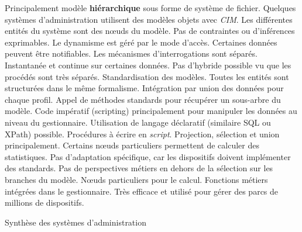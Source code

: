 \begin{table}[!ht]
\criteretabDonnee
    {Principalement modèle \textbf{hiérarchique} sous forme de système de fichier. Quelques systèmes d'administration utilisent des modèles objets avec \textit{CIM}.}
    {Les différentes entités du système sont des nœuds du modèle. Pas de contraintes ou d'inférences exprimables.}
    {Le dynamisme est géré par le mode d'accès. Certaines données peuvent être notifiables. Les mécanismes d'interrogations sont séparés.}
\criteretabTraitement
    {Instantanée et continue sur certaines données. Pas d'hybride possible vu que les procédés sont très séparés.}
    {Standardisation des modèles. Toutes les entités sont structurées dans le même formalisme. Intégration par union des données pour chaque profil.}
    {Appel de méthodes standards pour récupérer un sous-arbre du modèle. Code impératif (scripting) principalement pour manipuler les données au niveau du gestionnaire. Utilisation de langage déclaratif (similaire SQL ou XPath) possible.}
    {Procédures à écrire en \textit{script}. Projection, sélection et union principalement. Certains nœuds particuliers permettent de calculer des statistiques.}
\criteretabAdaptabilite
    {Pas d'adaptation spécifique, car les dispositifs doivent implémenter des standards.}
    {Pas de perspectives métiers en dehors de la sélection sur les branches du modèle.}
    {Nœuds particuliers pour le calcul. Fonctions métiers intégrées dans le gestionnaire.}
    {Très efficace et utilisé pour gérer des parcs de millions de dispositifs.}
\caption{Synthèse des systèmes d'administration}\label{tab:rw:supervision:administration:synthese}
\end{table}